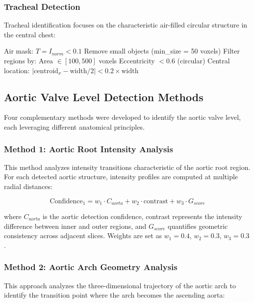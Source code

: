 \documentclass[11pt,a4paper]{article}
\begin{document}
\subsubsection{Tracheal Detection}
Tracheal identification focuses on the characteristic air-filled circular structure in the central chest:

\begin{algorithmic}[1]
\STATE Air mask: $T = I_{norm} < 0.1$
\STATE Remove small objects (min\_size = 50 voxels)
\STATE Filter regions by:
\STATE \quad Area $\in [100, 500]$ voxels
\STATE \quad Eccentricity $< 0.6$ (circular)
\STATE \quad Central location: $|\text{centroid}_x - \text{width}/2| < 0.2 \times \text{width}$
\end{algorithmic}

\subsection{Aortic Valve Level Detection Methods}

Four complementary methods were developed to identify the aortic valve level, each leveraging different anatomical principles.

\subsubsection{Method 1: Aortic Root Intensity Analysis}
This method analyzes intensity transitions characteristic of the aortic root region. For each detected aortic structure, intensity profiles are computed at multiple radial distances:

\begin{equation}
\text{Confidence}_1 = w_1 \cdot C_{aorta} + w_2 \cdot \text{contrast} + w_3 \cdot G_{score}
\end{equation}

where $C_{aorta}$ is the aortic detection confidence, contrast represents the intensity difference between inner and outer regions, and $G_{score}$ quantifies geometric consistency across adjacent slices. Weights are set as $w_1 = 0.4$, $w_2 = 0.3$, $w_3 = 0.3$.

\subsubsection{Method 2: Aortic Arch Geometry Analysis}
This approach analyzes the three-dimensional trajectory of the aortic arch to identify the transition point where the arch becomes the ascending aorta:
\end{document}
